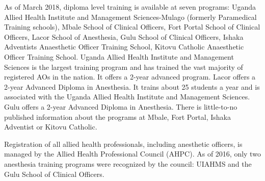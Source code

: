 \documentclass[12pt]{article} %
\begin{document}
As of March 2018, diploma level training is available at seven programs: Uganda Allied Health Institute and Management Sciences-Mulago (formerly Paramedical Training
schools), Mbale School of Clinical Officers, Fort Portal School of Clinical Officers, Lacor School of Anesthesia, Gulu School of Clinical Officers,  Ishaka Adventists Anaesthetic Officer Training School, Kitovu Catholic Anaesthetic Officer Training School. 
\cite{mohscholar2017}
Uganda Allied Health Institute and Management Sciences is the largest training program and has trained the vast majority of registered AOs in the nation. It offers a 2-year advanced program. 
\cite{mugalopara2013}
Lacor offers a 2-year Advanced Diploma in Anesthesia. It trains about 25 students a year and is associated with the Uganda Allied Health Institute and Management Sciences.
\cite{lacoranes2018}
Gulu offers a 2-year Advanced Diploma in Anesthesia.
There is little-to-no published information about the programs at Mbale, Fort Portal, Ishaka Adventist or Kitovu Catholic.

Registration of all allied health professionals, including anesthetic officers, is managed by the Allied Health Professional Council (AHPC). As of 2016, only two anesthesia training programs were recognized by the council: UIAHMS and the Gulu School of Clinical Officers. 
\end{document}
